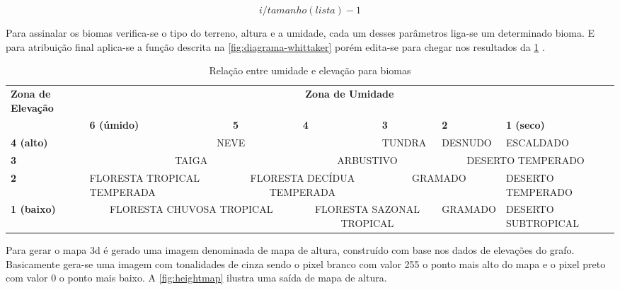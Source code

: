\begin{equation}
	\label{eq:umidade}
	i / tamanho(lista) - 1
\end{equation}


Para assinalar os biomas verifica-se o tipo do terreno, altura e a umidade, cada um desses parâmetros liga-se um determinado bioma. E para atribuição final aplica-se a função descrita na \cref{fig:diagrama-whittaker} porém edita-se para chegar nos resultados da \cref{tab:biomes} \space\cite{amitp2010}.

\begin{table}
	\centering
	\caption{Relação entre umidade e elevação para biomas}
	\label{tab:biomes}
	\begin{tabularx}{\textwidth}{|X|X|X|X|X|X|X|}
	\hline
	\textbf{Zona de Elevação} & \multicolumn{6}{c|}{\textbf{Zona de Umidade}} \\
	\cline{2-7}
	 & \textbf{6 (úmido)} & \textbf{5} & \textbf{4} & \textbf{3} & \textbf{2} & \textbf{1 (seco)} \\
	\hline
	\textbf{4 (alto)} & \multicolumn{3}{|c|}{NEVE} & TUNDRA & DESNUDO & ESCALDADO  \\
	\hline
	\textbf{3} & \multicolumn{2}{|c|}{TAIGA} & \multicolumn{2}{|c|}{ARBUSTIVO} & \multicolumn{2}{|c|}{DESERTO TEMPERADO} \\
	\hline
	\textbf{2} & FLORESTA TROPICAL TEMPERADA & \multicolumn{2}{|c|}{FLORESTA DECÍDUA TEMPERADA} & \multicolumn{2}{|c|}{GRAMADO} & DESERTO TEMPERADO  \\
	\hline
	\textbf{1 (baixo)} &  \multicolumn{2}{|c|}{FLORESTA CHUVOSA TROPICAL} & \multicolumn{2}{|c|}{FLORESTA SAZONAL TROPICAL} & GRAMADO & DESERTO SUBTROPICAL  \\
	\hline
	\end{tabularx}
\end{table}

Para gerar o mapa 3d é gerado uma imagem denominada de mapa de altura, construído com base nos dados de elevações do grafo. Basicamente gera-se uma imagem com tonalidades de cinza sendo o pixel branco com valor 255 o ponto mais alto do mapa e o pixel preto com valor 0 o ponto mais baixo. A \cref{fig:heightmap} ilustra uma saída de mapa de altura.

